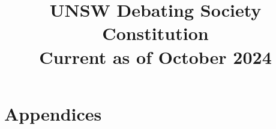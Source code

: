 \documentclass[12pt]{article}
\title{UNSW Debating Society Constitution \\[0.5em] \large Current as of October 2024}
\date{}
\begin{document}
\maketitle
\newpage
\tableofcontents













\appendix
\section{Appendices}


\end{document}
